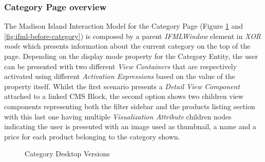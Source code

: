 \subsubsection{Category Page overview}

The Madison Island Interaction Model for the Category Page (Figure \ref{fig:desktop-before-category} and \ref{fig:ifml-before-category}) is composed by a parent \textit{IFMLWindow} element in \textit{XOR mode} which presents information about the current category on the top of the page. Depending on the display mode property for the Category Entity, the user can be presented with two different \textit{View Containers} that are respectively activated using different \textit{Activation Expressions} based on the value of the property itself. Whilst the first scenario presents a \textit{Detail View Component} attached to a linked CMS Block, the second option shows two children view components representing both the filter sidebar and the products listing section with this last one having multiple \textit{Visualization Attribute} children nodes indicating the user is presented with an image used as thumbnail, a name and a price for each product belonging to the category shown.

\vspace{0.5cm}
\begin{figure}[H]
  \centering
  \qquad
  \caption{Category Desktop Versions}%
  \label{fig:desktop-before-category}%
\end{figure}

